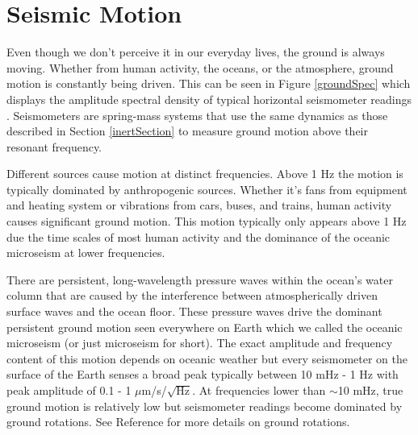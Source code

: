 \documentclass{book}
\begin{document}
\section{Seismic Motion}

\quad Even though we don't perceive it in our everyday lives, the ground is always moving. Whether from human activity, the oceans, or the atmosphere, ground motion is constantly being driven. This can be seen in Figure \ref{groundSpec} which displays the amplitude spectral density of typical horizontal seismometer readings \cite{ross2020precision}. Seismometers are spring-mass systems that use the same dynamics as those described in Section \ref{inertSection} to measure ground motion above their resonant frequency. 

Different sources cause motion at distinct frequencies. Above 1 Hz the motion is typically dominated by anthropogenic sources. Whether it's fans from equipment and heating system or vibrations from cars, buses, and trains, human activity causes significant ground motion. This motion typically only appears above 1 Hz due the time scales of most human activity and the dominance of the oceanic microseism at lower frequencies. 

There are persistent, long-wavelength pressure waves within the ocean's water column that are caused by the interference between atmospherically driven surface waves and the ocean floor. These pressure waves drive the dominant persistent ground motion seen everywhere on Earth which we called the oceanic microseism (or just microseism for short). The exact amplitude and frequency content of this motion depends on oceanic weather but every seismometer on the surface of the Earth senses a broad peak typically between 10 mHz - 1 Hz with peak amplitude of 0.1 - 1 $\mu$m/s/$\sqrt{\text{Hz}}$. At frequencies lower than $\sim$10 mHz, true ground motion is relatively low but seismometer readings become dominated by ground rotations. See Reference \cite{ross2020precision} for more details on ground rotations.
\end{document}
